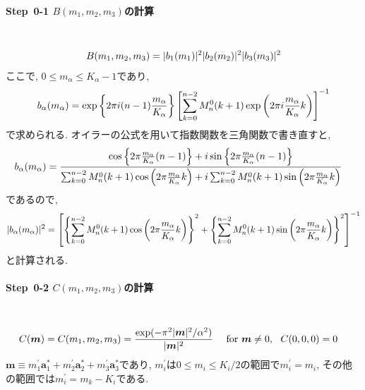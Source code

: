 \paragraph{Step~0-1 $B(m_{1}, m_{2}, m_{3})$の計算} \
\begin{align}
   B(m_{1}, m_{2}, m_{3})
 =
   |b_{1}(m_{1})|^{2} |b_{2}(m_{2})|^{2} |b_{3}(m_{3})|^{2}
 \notag
\end{align}
ここで, $0 \le m_{\alpha} \le K_{\alpha}-1$であり,
\begin{align}
  b_{\alpha} (m_{\alpha})
 =
   \exp \left\{2 \pi i (n-1) \frac{m_{\alpha}}{K_{\alpha}} \right\}
   \left[
         \sum_{k=0}^{n-2} M_{n}^{0}(k+1) \exp \left(2 \pi i \frac{m_{\alpha}}{K_{\alpha}} k \right)
   \right]^{-1}
 \notag
\end{align}
で求められる. オイラーの公式を用いて指数関数を三角関数で書き直すと,
\begin{align}
   b_{\alpha} (m_{\alpha})
 &=
   \frac{\cos\left\{2 \pi \frac{m_{\alpha}}{K_{\alpha}}(n-1)\right\} + i \sin\left\{2 \pi \frac{m_{\alpha}}{K_{\alpha}}(n-1)\right\}}
        {   \sum_{k=0}^{n-2} M_{n}^{0}(k+1) \cos \left(2 \pi \frac{m_{\alpha}}{K_{\alpha}} k \right)
         +i \sum_{k=0}^{n-2} M_{n}^{0}(k+1) \sin \left(2 \pi \frac{m_{\alpha}}{K_{\alpha}} k \right)
         }
 \notag
\end{align}
であるので,
\begin{align}
   |b_{\alpha}(m_{\alpha})|^{2}
 = \left[
          \left\{ \sum_{k=0}^{n-2} M_{n}^{0}(k+1) \cos \left(2 \pi \frac{m_{\alpha}}{K_{\alpha}} k \right) \right\}^{2}
        + \left\{ \sum_{k=0}^{n-2} M_{n}^{0}(k+1) \sin \left(2 \pi \frac{m_{\alpha}}{K_{\alpha}} k \right) \right\}^{2}
   \right]^{-1}
 \notag
\end{align}
と計算される.

\paragraph{Step~0-2 $C(m_{1}, m_{2}, m_{3})$の計算} \
\begin{align}
  &C(\bm{m})
 = C(m_{1}, m_{2}, m_{3})
= \frac {\exp( - \pi^{2}|\bm{m}|^{2} / \alpha^{2} ) }{|\bm{m}|^{2}}
 ~~~~\textrm{for $\bm{m} \neq 0$}, ~~C(0,0,0) = 0
 \notag
\end{align}
$\bm{m} \equiv m_{1}^{\prime}\bm{a}_{1}^{*} + m_{2}^{\prime} \bm{a}_{2}^{*}+ m_{3}^{\prime}\bm{a}_{3}^{*}$であり,
$m_{i}^{\prime}$は$0 \le m_{i} \le K_{i}/2$の範囲で$m_{i}^{\prime} = m_{i}$, その他の範囲では$m_{i}^{\prime} = m_{k} - K_{i}$である.

